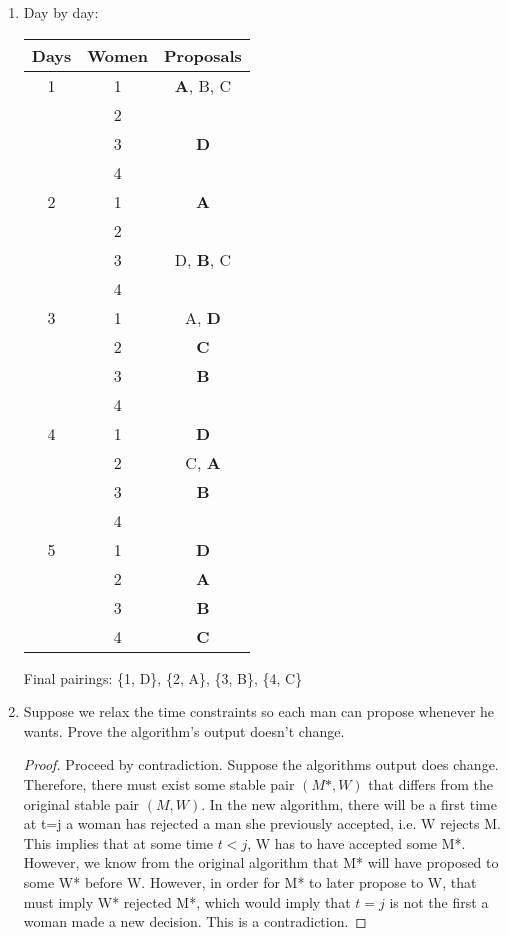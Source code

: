 \documentclass[11pt, notitlepage]{report}
\begin{document}
\begin{enumerate}[label=(\alph*)]
	\item Day by day:
	
		\begin{center}
		\begin{tabular}{ | c || c| c | } 
		\hline
		Days & Women & Proposals \\
		\hline
		1 &1  & \textbf{A}, B, C \\ 
		  &2  & \\ 
		  &3  & \textbf{D} \\ 
		  &4  & \\ 
		\hline
		2 &1  & \textbf{A} \\ 
		  &2  & \\ 
		  &3  & D, \textbf{B}, C \\ 
		  &4  & \\ 
		\hline
		3 &1  & A, \textbf{D} \\ 
		  &2  & \textbf{C} \\ 
		  &3  & \textbf{B} \\ 
		  &4  & \\ 
		\hline
		4 &1  & \textbf{D}\\ 
		  &2  & C, \textbf{A}\\ 
		  &3  & \textbf{B}\\ 
		  &4  & \\ 
		\hline
		5 &1  & \textbf{D}\\ 
		  &2  & \textbf{A}\\ 
		  &3  & \textbf{B}\\ 
		  &4  & \textbf{C}\\ 
		\hline
		\end{tabular}
		\end{center}
		
		Final pairings: \{1, D\}, \{2, A\}, \{3, B\}, \{4, C\}
		\\
	\item Suppose we relax the time constraints so each man can propose whenever he wants. Prove the algorithm's output doesn't change.
		
		\begin{proof} Proceed by contradiction. Suppose the algorithms output does change. Therefore,
			there must exist some stable pair $(M*,W)$ that differs from the original stable pair $(M,W)$. In the new algorithm, there will be a first time at t=j a woman has rejected a man she previously accepted, i.e. W rejects M. This implies that at some time $t<j$, W has to have accepted some M*. However, we know from the original algorithm that M* will have proposed to some W* before W. However, in order for M* to later propose to W, that must imply W* rejected M*, which would imply that $t=j$ is not the first a woman made a new decision. This is a contradiction.

		\end{proof}

\end{enumerate}
\end{document}
